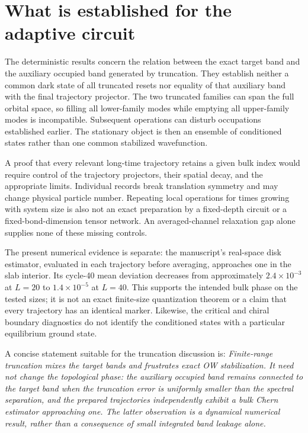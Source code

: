 \documentclass[aps,prb,onecolumn,nofootinbib,superscriptaddress]{revtex4-2}
\begin{document}
\section{What is established for the adaptive circuit}

The deterministic results concern the relation between the exact target band and the auxiliary occupied band generated by truncation. They establish neither a common dark state of all truncated resets nor equality of that auxiliary band with the final trajectory projector. The two truncated families can span the full orbital space, so filling all lower-family modes while emptying all upper-family modes is incompatible. Subsequent operations can disturb occupations established earlier. The stationary object is then an ensemble of conditioned states rather than one common stabilized wavefunction.

A proof that every relevant long-time trajectory retains a given bulk index would require control of the trajectory projectors, their spatial decay, and the appropriate limits. Individual records break translation symmetry and may change physical particle number. Repeating local operations for times growing with system size is also not an exact preparation by a fixed-depth circuit or a fixed-bond-dimension tensor network. An averaged-channel relaxation gap alone supplies none of these missing controls.

The present numerical evidence is separate: the manuscript's real-space disk estimator, evaluated in each trajectory before averaging, approaches one in the slab interior. Its cycle-40 mean deviation decreases from approximately $2.4\times10^{-3}$ at $L=20$ to $1.4\times10^{-5}$ at $L=40$. This supports the intended bulk phase on the tested sizes; it is not an exact finite-size quantization theorem or a claim that every trajectory has an identical marker. Likewise, the critical and chiral boundary diagnostics do not identify the conditioned states with a particular equilibrium ground state.

A concise statement suitable for the truncation discussion is: \emph{Finite-range truncation mixes the target bands and frustrates exact OW stabilization. It need not change the topological phase: the auxiliary occupied band remains connected to the target band when the truncation error is uniformly smaller than the spectral separation, and the prepared trajectories independently exhibit a bulk Chern estimator approaching one. The latter observation is a dynamical numerical result, rather than a consequence of small integrated band leakage alone.}
\end{document}
